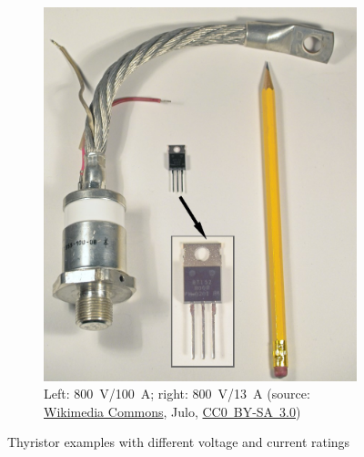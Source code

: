 \begin{frame}[b]
\begin{figure}
\begin{subfigure}{0.45\textwidth}
            \includegraphics[height=0.45\textheight]{fig/lec05/Thyristor_example_02.jpg}
			\caption{Left: \SI{800}{\volt}/\SI{100}{\ampere}; right: \SI{800}{\volt}/\SI{13}{\ampere} (source: \href{https://de.wikipedia.org/wiki/Datei:Thyristors_thyristoren.jpg}{Wikimedia Commons}, Julo, \href{https://creativecommons.org/licenses/by-sa/3.0/deed.de}{CC0~BY-SA~3.0})}
            \vspace{2em}
        \end{subfigure}
        \caption{Thyristor examples with different voltage and current ratings}
        \label{fig:thyristor_examples}
    \end{figure}
\end{frame}

